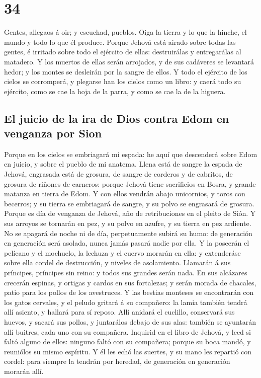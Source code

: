 \hypertarget{section-33}{%
\section{34}\label{section-33}}

 Gentes, allegaos á oir; y escuchad, pueblos. Oiga la
tierra y lo que la hinche, el mundo y todo lo que él produce.
 Porque Jehová está airado sobre todas las gentes, é
irritado sobre todo el ejército de ellas: destruirálas y entregarálas al
matadero.  Y los muertos de ellas serán arrojados, y de
sus cadáveres se levantará hedor; y los montes se desleirán por la
sangre de ellos.  Y todo el ejército de los cielos se
corromperá, y plegarse han los cielos como un libro: y caerá todo su
ejército, como se cae la hoja de la parra, y como se cae la de la
higuera.

\hypertarget{el-juicio-de-la-ira-de-dios-contra-edom-en-venganza-por-sion}{%
\subsection{El juicio de la ira de Dios contra Edom en venganza por
Sion}\label{el-juicio-de-la-ira-de-dios-contra-edom-en-venganza-por-sion}}

 Porque en los cielos se embriagará mi espada: he aquí que
descenderá sobre Edom en juicio, y sobre el pueblo de mi anatema.
 Llena está de sangre la espada de Jehová, engrasada está
de grosura, de sangre de corderos y de cabritos, de grosura de riñones
de carneros: porque Jehová tiene sacrificios en Bosra, y grande matanza
en tierra de Edom.  Y con ellos vendrán abajo unicornios,
y toros con becerros; y su tierra se embriagará de sangre, y su polvo se
engrasará de grosura.  Porque es día de venganza de
Jehová, año de retribuciones en el pleito de Sión.  Y sus
arroyos se tornarán en pez, y su polvo en azufre, y su tierra en pez
ardiente.  No se apagará de noche ni de día,
perpetuamente subirá su humo: de generación en generación será asolada,
nunca jamás pasará nadie por ella.  Y la poseerán el
pelícano y el mochuelo, la lechuza y el cuervo morarán en ella: y
extenderáse sobre ella cordel de destrucción, y niveles de asolamiento.
 Llamarán á sus príncipes, príncipes sin reino: y todos
sus grandes serán nada.  En sus alcázares crecerán
espinas, y ortigas y cardos en sus fortalezas; y serán morada de
chacales, patio para los pollos de los avestruces.  Y las
bestias monteses se encontrarán con los gatos cervales, y el peludo
gritará á su compañero: la lamia también tendrá allí asiento, y hallará
para sí reposo.  Allí anidará el cuclillo, conservará sus
huevos, y sacará sus pollos, y juntarálos debajo de sus alas: también se
ayuntarán allí buitres, cada uno con su compañera. 
Inquirid en el libro de Jehová, y leed si faltó alguno de ellos: ninguno
faltó con su compañera; porque su boca mandó, y reuniólos su mismo
espíritu.  Y él les echó las suertes, y su mano les
repartió con cordel: para siempre la tendrán por heredad, de generación
en generación morarán allí.

